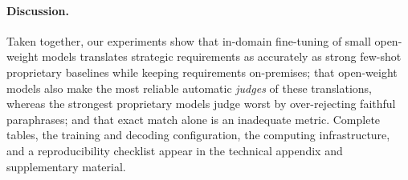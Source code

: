 \paragraph{Discussion.}
Taken together, our experiments show that in-domain fine-tuning of small open-weight models translates strategic requirements as accurately as strong few-shot proprietary baselines while keeping requirements on-premises; that open-weight models also make the most reliable automatic \emph{judges} of these translations, whereas the strongest proprietary models judge worst by over-rejecting faithful paraphrases; and that exact match alone is an inadequate metric. Complete tables, the training and decoding configuration, the computing infrastructure, and a reproducibility checklist appear in the technical appendix and supplementary material.